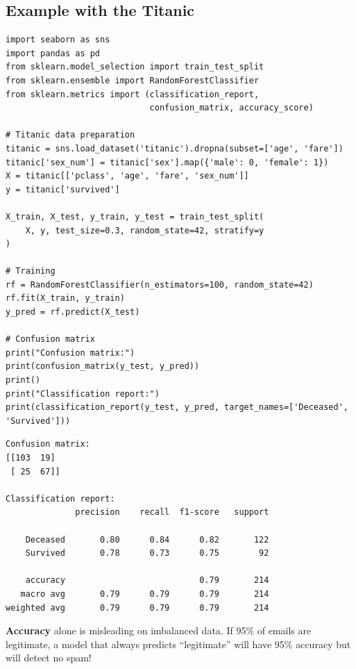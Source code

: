 \subsection{Example with the Titanic}

\begin{codeblock}[title=\textbf{Python}]
\begin{verbatim}
import seaborn as sns
import pandas as pd
from sklearn.model_selection import train_test_split
from sklearn.ensemble import RandomForestClassifier
from sklearn.metrics import (classification_report,
                             confusion_matrix, accuracy_score)

# Titanic data preparation
titanic = sns.load_dataset('titanic').dropna(subset=['age', 'fare'])
titanic['sex_num'] = titanic['sex'].map({'male': 0, 'female': 1})
X = titanic[['pclass', 'age', 'fare', 'sex_num']]
y = titanic['survived']

X_train, X_test, y_train, y_test = train_test_split(
    X, y, test_size=0.3, random_state=42, stratify=y
)

# Training
rf = RandomForestClassifier(n_estimators=100, random_state=42)
rf.fit(X_train, y_train)
y_pred = rf.predict(X_test)

# Confusion matrix
print("Confusion matrix:")
print(confusion_matrix(y_test, y_pred))
print()
print("Classification report:")
print(classification_report(y_test, y_pred, target_names=['Deceased', 'Survived']))
\end{verbatim}
\end{codeblock}

\begin{codeoutput}
\begin{verbatim}
Confusion matrix:
[[103  19]
 [ 25  67]]

Classification report:
              precision    recall  f1-score   support

    Deceased       0.80      0.84      0.82       122
    Survived       0.78      0.73      0.75        92

    accuracy                           0.79       214
   macro avg       0.79      0.79      0.79       214
weighted avg       0.79      0.79      0.79       214
\end{verbatim}
\end{codeoutput}

\begin{warning}
\textbf{Accuracy} alone is misleading on imbalanced data. If 95\% of emails are legitimate, a model that always predicts ``legitimate'' will have 95\% accuracy but will detect no spam!
\end{warning}

